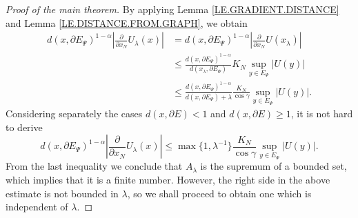 \documentclass[10pt]{amsart}
\theoremstyle{definition}
\numberwithin{equation}{section}
\begin{document}
\begin{proof}[Proof of the main theorem]
By applying  Lemma \ref{LE.GRADIENT.DISTANCE} and  Lemma \ref{LE.DISTANCE.FROM.GRAPH},                         we obtain
\begin{equation*}\begin{split}
d (x, \partial E_\Psi )^{1 - \alpha}  \left| \frac {\partial} {\partial x_N} U_\lambda (x)\right|  
& = d (x, \partial E_\Psi )^{1 - \alpha} \left| \frac {\partial} {\partial x_N}  U  (x_\lambda)\right|
\\&  \le \frac { d (x, \partial E_\Psi )^{1 - \alpha} }{ d (x_\lambda, \partial  E_\Psi ) } 
K_N \sup _{y\in  E_\Psi}|U(y)|
\\&  \le \frac { d (x, \partial E_\Psi )^{1 - \alpha} }{ d (x, \partial E_\Psi) +\lambda }
\frac { K_N }{\cos \gamma}\sup _{y\in E_\Psi}|U(y)|.
\end{split}\end{equation*}
Considering  separately the cases  $d(x,\partial E)<1$   and   $d(x,\partial E)\ge 1$,         it is  not hard to derive
\begin{equation*}
d (x, \partial E_\Psi )^{1 - \alpha}  \left| \frac {\partial} {\partial x_N}  U_\lambda(x)\right|
\le  \max \{1, \lambda ^{-1}\} \frac {K_N}{\cos \gamma} \sup _{y\in E_\Psi}|U(y)|.
\end{equation*}
From the last inequality we conclude that $A_\lambda$ is the supremum of a bounded set,         which implies that it is
a finite number. However,  the  right side in the  above estimate is not bounded  in $\lambda$,   so we shall proceed to
obtain  one which is independent of $\lambda$.


\end{proof}
\end{document}
